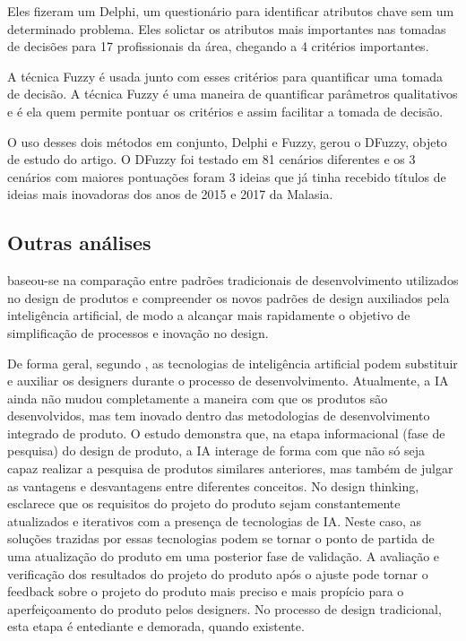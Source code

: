  Eles fizeram um Delphi, um questionário para identificar atributos chave sem um determinado problema. Eles solictar os atributos mais importantes nas tomadas de decisões para 17 profissionais da área, chegando a 4 critérios importantes. 

A técnica Fuzzy é usada junto com esses critérios para quantificar uma tomada de decisão. A técnica Fuzzy é uma maneira de quantificar parâmetros qualitativos e é ela quem permite pontuar os critérios e assim facilitar a tomada de decisão.

O uso desses dois métodos em conjunto, Delphi e Fuzzy, gerou o DFuzzy, objeto de estudo do artigo. O DFuzzy foi testado em 81 cenários diferentes e os 3 cenários com maiores pontuações foram 3 ideias que já tinha recebido títulos de ideias mais inovadoras dos anos de 2015 e 2017 da Malasia.




\subsection*{Outras análises}

 baseou-se na comparação entre padrões tradicionais de desenvolvimento utilizados no design de produtos e compreender os novos padrões de design auxiliados pela inteligência artificial, de modo a alcançar mais rapidamente o objetivo de simplificação de processos e inovação no design.

De forma geral, segundo , as tecnologias de inteligência artificial podem substituir e auxiliar os designers durante o processo de desenvolvimento. Atualmente, a IA ainda não mudou completamente a maneira com que os produtos são desenvolvidos, mas tem inovado dentro das metodologias de desenvolvimento integrado de produto. O estudo demonstra que, na etapa informacional (fase de pesquisa) do design de produto, a IA interage de forma com que não só seja capaz realizar a pesquisa de produtos similares anteriores, mas também de julgar as vantagens e desvantagens entre diferentes conceitos. No design thinking,  esclarece que os requisitos do projeto do produto sejam constantemente atualizados e iterativos com a presença de tecnologias de IA. Neste caso, as soluções trazidas por essas tecnologias podem se tornar o ponto de partida de uma atualização do produto em uma posterior fase de validação. A avaliação e verificação dos resultados do projeto do produto após o ajuste pode tornar o feedback sobre o projeto do produto mais preciso e mais propício para o aperfeiçoamento do produto pelos designers. No processo de design tradicional, esta etapa é entediante e demorada, quando existente.

